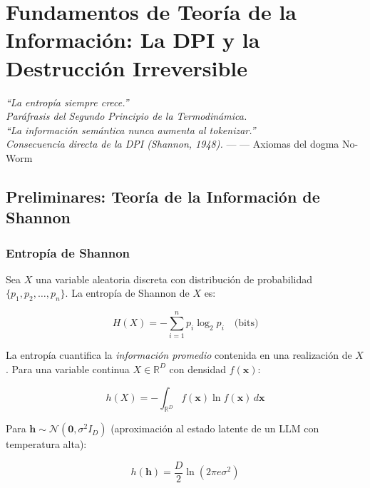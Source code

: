 \chapter{Fundamentos de Teoría de la Información: La DPI y la Destrucción Irreversible}


\textit{``La entropía siempre crece.''\\
Paráfrasis del Segundo Principio de la Termodinámica.\\[0.3cm]
``La información semántica nunca aumenta al tokenizar.''\\
Consecuencia directa de la DPI (Shannon, 1948).} --- --- Axiomas del dogma No-Worm

\section{Preliminares: Teoría de la Información de Shannon}

\subsection{Entropía de Shannon}

Sea $X$ una variable aleatoria discreta con distribución de probabilidad
$\{p_1, p_2, \ldots, p_n\}$. La entropía de Shannon de $X$ es:

\begin{equation}
H(X) = -\sum_{i=1}^{n} p_i \log_2 p_i \quad \text{(bits)}

\end{equation}

La entropía cuantifica la \textit{información promedio} contenida en una realización
de $X$. Para una variable continua $X \in \mathbb{R}^D$ con densidad $f(\mathbf{x})$:

\begin{equation}
h(X) = -\int_{\mathbb{R}^D} f(\mathbf{x}) \ln f(\mathbf{x}) \, d\mathbf{x}

\end{equation}

Para $\mathbf{h} \sim \mathcal{N}(\mathbf{0}, \sigma^2 I_D)$ (aproximación al
estado latente de un LLM con temperatura alta):

\begin{equation}
h(\mathbf{h}) = \frac{D}{2} \ln(2\pi e \sigma^2)
\end{equation}

